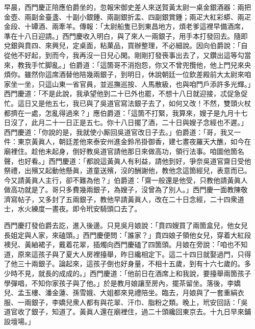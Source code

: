 早晨，西門慶正陪應伯爵坐的，忽報宋御史差人來送賀黃太尉一桌金銀酒器：兩把金壺、兩副金臺盞、十副小銀鍾、兩副銀折盂、四副銀賞鍾；兩疋大紅彩蟒、兩疋金段、十罈酒、兩牽羊。傳報：「太尉船隻已到東昌地方，煩老爹這裡早備酒席，準在十八日迎請。」西門慶收入明白，與了來人一兩銀子，用手本打發回去。隨即兌銀與賁四、來興兒，定桌面，粘菓品，買辦整理，不必細說。因向伯爵說：「自從他不好起，到而今，我再沒一日兒心閑。剛剛打發䘮事出去了，又鑽出這等勾當來，教我手忙脚亂。」{}伯爵道：「這箇哥不消抱怨，你又不曾兜攬他，他上門兒來央煩你。雖然你這席酒替他陪幾兩銀子，到明日，休說朝廷一位欽差殿前大太尉來咱家坐一坐，只這山東一省官員，並巡撫巡按、人馬散級，也與咱門戶添許多光輝。」{}西門慶道：「不是此說，我承望他到二十已外也罷，不想十八日就迎接，忒促急促忙。這日又是他五七，我已與了吳道官寫法銀子去了，如何又改！不然，雙頭火杖都擠在一處，怎亂得過來？」應伯爵道：「這箇不打緊，我算來，嫂子是九月十七日沒了，此月二十一日正是五七。你十八日擺了酒，二十日與嫂子念經也不遲。」西門慶道：「你說的是，我就使小厮回吳道官改日子去。」伯爵道：「哥，我又一件：東京黃眞人，朝廷差他來泰安州進金鈴吊掛御香，建七晝夜羅天大醮，如今在廟裡住。趁他未起身，倒好教吳道官請他那日來做高功，領行法事。咱圖他箇名聲，也好看。」{}西門慶道：「都說這黃眞人有利益，{}請他到好，爭奈吳道官齋日受他祭禮，出殯又起動他懸眞，道童送殯，沒的酬謝他，教他念這箇經兒，表意而已。今又請黃眞人主行，卻不難為他？」伯爵道：「齋一般還是他受，只教他請黃眞人做高功就是了。哥只多費幾兩銀子，為嫂子，沒曾為了別人。」{}西門慶一面教陳敬濟寫帖子，又多封了五兩銀子，教他早請黃眞人，改在二十日念經，二十四衆道士，水火練度一晝夜。即令玳安騎頭口去了。

西門慶打發伯爵去訖，進入後邊。只見吳月娘說：「賁四嫂買了兩箇盒兒，他女兒長姐定與人家，來磕頭。」西門慶便問：「誰家？」賁四娘子領他女兒，穿着大紅段襖兒、黃紬裙子，戴着花翠，插燭向西門慶磕了四箇頭。月娘在旁說：「咱也不知道，原來這孩子與了夏大人房裡擡舉，昨日纔相定下。{}這二十四日就娶過門，只得了他三十兩銀子。論起來，這孩子倒也好身量，不相十五歲，到有十六七歲的。多少時不見，就長的成成的。」西門慶道：「他前日在酒席上和我說，要擡舉兩箇孩子學彈唱，不知你家孩子與了他。」於是教月娘讓至房內，擺茶留坐。落後，李嬌兒、孟玉樓、潘金蓮、孫雪娥、大姐都來見禮陪坐。臨去，月娘與了一套重絹衣服、一兩銀子，李嬌兒衆人都有與花翠、汗巾、脂粉之類。晚上，玳安回話：「吳道官收了銀子，知道了。黃眞人還在廟裡住，過二十頭纔回東京去。十九日早來鋪設壇場。」

